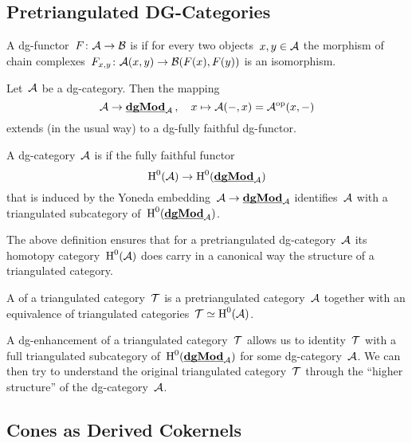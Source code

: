 \documentclass[a4paper,10pt]{scrartcl}
\begin{document}
\subsection{Pretriangulated DG-Categories}

\begin{definition}
  A dg-functor~$F \colon \mathcal{A} \to \mathcal{B}$ is  if for every two objects~$x, y \in \mathcal{A}$ the morphism of chain complexes~$F_{x,y} \colon \mathcal{A}(x,y) \to \mathcal{B}(F(x), F(y))$ is an isomorphism.
\end{definition}

\begin{proposition}
  Let~$\mathcal{A}$ be a dg-category.
  Then the mapping
  \[
    \mathcal{A}
    \to
    \underline{\smash{\mathbf{dgMod}}}_{\mathcal{A}} \,,
    \quad
    x
    \mapsto
    \mathcal{A}(-,x)
    =
    \mathcal{A}^{{\mathrm{op}}}(x,-)
  \]
  extends (in the usual way) to a dg-fully faithful dg-functor.
\end{proposition}

\begin{definition}
  A dg-category~$\mathcal{A}$ is  if the fully faithful {\klinear} functor
  \[
    \operatorname{H}^0(\mathcal{A})
    \to
    \operatorname{H}^0(\underline{\smash{\mathbf{dgMod}}}_{\mathcal{A}})
  \]
  that is induced by the Yoneda embedding~$\mathcal{A} \to \underline{\smash{\mathbf{dgMod}}}_{\mathcal{A}}$ identifies~$\mathcal{A}$ with a triangulated subcategory of~$\operatorname{H}^0(\underline{\smash{\mathbf{dgMod}}}_{\mathcal{A}})$.
\end{definition}

The above definition ensures that for a pretriangulated dg-category~$\mathcal{A}$ its homotopy category~$\operatorname{H}^0(\mathcal{A})$ does carry in a canonical way the structure of a triangulated category.

\begin{definition}
  A  of a triangulated category~$\mathcal{T}$ is a pretriangulated category~$\mathcal{A}$ together with an equivalence of triangulated categories~$\mathcal{T} \simeq \operatorname{H}^0(\mathcal{A})$.
\end{definition}


A dg-enhancement of a triangulated category~$\mathcal{T}$ allows us to identity~$\mathcal{T}$ with a full triangulated subcategory of~$\operatorname{H}^0(\underline{\smash{\mathbf{dgMod}}}_{\mathcal{A}})$ for some dg-category~$\mathcal{A}$.
We can then try to understand the original triangulated category~$\mathcal{T}$ through the \enquote{higher structure} of the dg-category~$\mathcal{A}$.



\subsection{Cones as Derived Cokernels}
\end{document}

